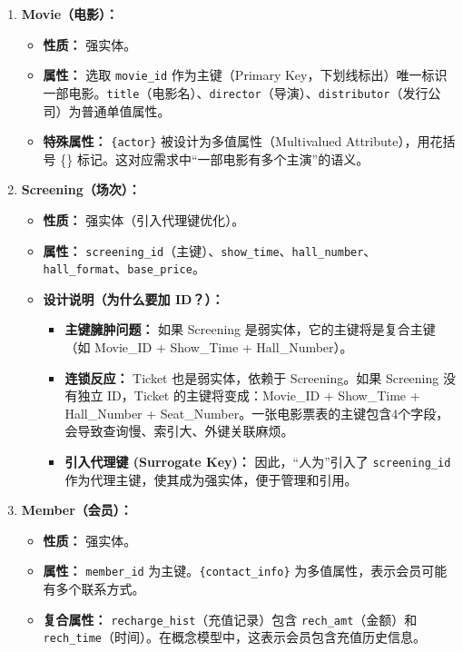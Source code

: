 \documentclass[a4paper]{article}
\begin{document}
\begin{enumerate}
    \item \textbf{Movie（电影）：}
    \begin{itemize}
        \item \textbf{性质：} 强实体。
        \item \textbf{属性：} 选取 \texttt{movie\_id} 作为主键（Primary Key，下划线标出）唯一标识一部电影。\texttt{title}（电影名）、\texttt{director}（导演）、\texttt{distributor}（发行公司）为普通单值属性。
        \item \textbf{特殊属性：} \texttt{\{actor\}} 被设计为多值属性（Multivalued Attribute），用花括号 \{\} 标记。这对应需求中“一部电影有多个主演”的语义。
    \end{itemize}

    \item \textbf{Screening（场次）：}
    \begin{itemize}
        \item \textbf{性质：} 强实体（引入代理键优化）。
        \item \textbf{属性：} \texttt{screening\_id}（主键）、\texttt{show\_time}、\texttt{hall\_number}、\texttt{hall\_format}、\texttt{base\_price}。
        \item \textbf{设计说明（为什么要加 ID？）：}
        \begin{itemize}
            \item \textbf{主键臃肿问题：} 如果 Screening 是弱实体，它的主键将是复合主键（如 Movie\_ID + Show\_Time + Hall\_Number）。
            \item \textbf{连锁反应：} Ticket 也是弱实体，依赖于 Screening。如果 Screening 没有独立 ID，Ticket 的主键将变成：Movie\_ID + Show\_Time + Hall\_Number + Seat\_Number。一张电影票表的主键包含4个字段，会导致查询慢、索引大、外键关联麻烦。
            \item \textbf{引入代理键 (Surrogate Key)：} 因此，“人为”引入了 \texttt{screening\_id} 作为代理主键，使其成为强实体，便于管理和引用。
        \end{itemize}
    \end{itemize}

    \item \textbf{Member（会员）：}
    \begin{itemize}
        \item \textbf{性质：} 强实体。
        \item \textbf{属性：} \texttt{member\_id} 为主键。\texttt{\{contact\_info\}} 为多值属性，表示会员可能有多个联系方式。
        \item \textbf{复合属性：} \texttt{recharge\_hist}（充值记录）包含 \texttt{rech\_amt}（金额）和 \texttt{rech\_time}（时间）。在概念模型中，这表示会员包含充值历史信息。
    \end{itemize}


\end{enumerate}
\end{document}
